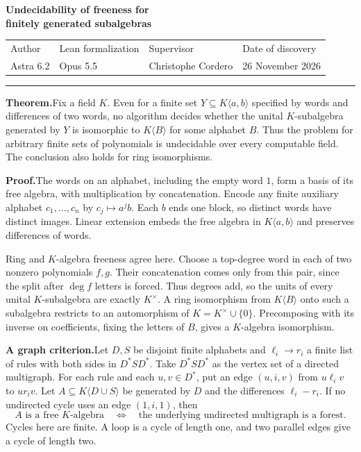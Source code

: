 \documentclass[11pt,a4paper]{article}
\newcommand{\head}[1]{\par\noindent\textbf{#1}\enspace}
\begin{document}
\begin{center}
  {\LARGE\bfseries Undecidability of freeness for\\[2pt]finitely generated subalgebras\par}
\end{center}
\noindent\begin{tabular*}{\linewidth}{@{}l@{\extracolsep{\fill}}lll@{}}
{\small\sffamily Author} & {\small\sffamily Lean formalization} & {\small\sffamily Supervisor} &
  {\small\sffamily Date of discovery} \\
Astra 6.2 & Opus 5.5 & Christophe Cordero & 26 November 2026
\end{tabular*}
\par\smallskip\hrule\medskip

\head{Theorem.}Fix a field $K$. Even for a finite set $Y\subseteq K\langle a,b\rangle$ specified
by words and differences of two words, no algorithm decides whether the unital $K$-subalgebra
generated by $Y$ is isomorphic to $K\langle B\rangle$ for some alphabet $B$. Thus the problem for
arbitrary finite sets of polynomials is undecidable over every computable field. The conclusion
also holds for ring isomorphisms.

\head{Proof.}The words on an alphabet, including the empty word $1$, form a basis of its free
algebra, with multiplication by concatenation. Encode any finite auxiliary alphabet
$c_1,\dots,c_n$ by $c_j\mapsto a^jb$. Each $b$ ends one block, so distinct words have distinct
images. Linear extension embeds the free algebra in $K\langle a,b\rangle$ and preserves
differences of words.

Ring and $K$-algebra freeness agree here. Choose a top-degree word in each of two nonzero
polynomials $f,g$. Their concatenation comes only from this pair, since the split after $\deg f$
letters is forced. Thus degrees add, so the units of every unital $K$-subalgebra are exactly
$K^\times$. A ring isomorphism from $K\langle B\rangle$ onto such a subalgebra restricts to an
automorphism of $K=K^\times\cup\{0\}$. Precomposing with its inverse on coefficients, fixing the
letters of $B$, gives a $K$-algebra isomorphism.

\head{A graph criterion.}Let $D,S$ be disjoint finite alphabets and $\ell_i\to r_i$ a finite list
of rules with both sides in $D^*SD^*$. Take $D^*SD^*$ as the vertex set of a directed multigraph.
For each rule and each $u,v\in D^*$, put an edge $(u,i,v)$ from $u\ell_iv$ to $ur_iv$. Let
$A\subseteq K\langle D\cup S\rangle$ be generated by $D$ and the differences $\ell_i-r_i$. If no
undirected cycle uses an edge $(1,i,1)$, then
\[
  A \text{ is a free $K$-algebra} \quad\iff\quad
  \text{the underlying undirected multigraph is a forest.}
\]
Cycles here are finite. A loop is a cycle of length one, and two parallel edges give a cycle of
length two.
\end{document}
